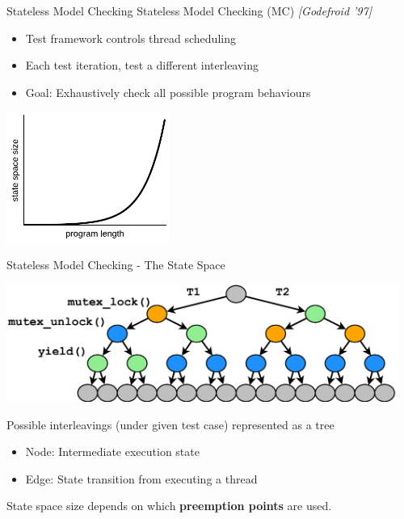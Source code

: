 \documentclass[xcolor=dvipsnames]{beamer}
\begin{document}
\begin{frame}{Stateless Model Checking}
	Stateless Model Checking (MC) {\em [Godefroid '97]}
	\begin{itemize}
		\item Test framework controls thread scheduling
		\item Each test iteration, test a different interleaving
		\item Goal: Exhaustively check all possible program behaviours
	\end{itemize}
	\pause
	\linegap

	\begin{center}
		\includegraphics[width=0.4\textwidth]{exponence.pdf}
	\end{center}
\end{frame}

\begin{frame}{Stateless Model Checking - The State Space}
	\begin{center}
		\includegraphics[width=0.96\textwidth]{../../oopsla/tree-maximal-only.pdf}
	\end{center}
	\linegap

	Possible interleavings (under given test case) represented as a tree
	\begin{itemize}
		\item Node: Intermediate execution state
		\item Edge: State transition from executing a thread
	\end{itemize}
	\linegap

	State space size depends on which {\bf preemption points} are used.
\end{frame}
\end{document}
